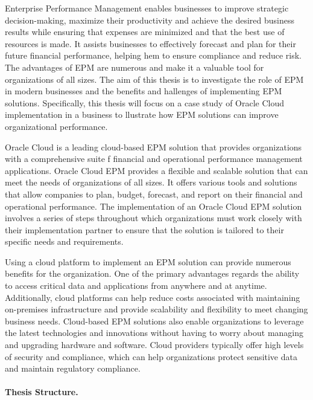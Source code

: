 \documentclass[12pt,a4paper,openright,twoside]{book}
\begin{document}
Enterprise Performance Management enables businesses to improve strategic decision-making, maximize their productivity and achieve the desired business results while ensuring that expenses are minimized and that the best use of resources is made.
%
It assists businesses to effectively forecast and plan for their future financial performance, helping hem to ensure compliance and reduce risk. 
%
The advantages of EPM are numerous and make it a valuable tool for organizations of all sizes.
The aim of this thesis is to investigate the role of EPM in modern businesses and the benefits and hallenges of implementing EPM solutions. 
%
Specifically, this thesis will focus on a case study of Oracle Cloud implementation in a business to llustrate how EPM solutions can improve organizational performance. 

Oracle Cloud is a leading cloud-based EPM solution that provides organizations with a comprehensive suite f financial and operational performance management applications.
%
Oracle Cloud EPM provides a flexible and scalable solution that can meet the needs of organizations of all sizes.
%
It offers various tools and solutions that allow companies to plan, budget, forecast, and report on their financial and operational performance.
%
The implementation of an Oracle Cloud EPM solution involves a series of steps throughout which organizations must work closely with their implementation partner to ensure that the solution is tailored to their specific needs and requirements.

Using a cloud platform to implement an EPM solution can provide numerous benefits for the organization. 
%
One of the primary advantages regards the ability to access critical data and applications from anywhere and at anytime.
%
Additionally, cloud platforms can help reduce costs associated with maintaining on-premises infrastructure and provide scalability and flexibility to meet changing business needs. 
%
Cloud-based EPM solutions also enable organizations to leverage the latest technologies and innovations without having to worry about managing and upgrading hardware and software. 
%
Cloud providers typically offer high levels of security and compliance, which can help organizations protect sensitive data and maintain regulatory compliance. 

%
\paragraph{Thesis Structure.}
%
\end{document}
